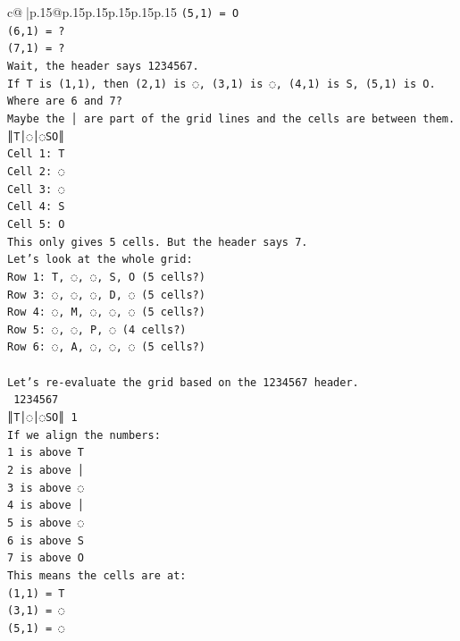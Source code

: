 \documentclass{article}
\begin{document}
{\begin{supertabular}{c@{$\;$}|p{.15\linewidth}@{}p{.15\linewidth}p{.15\linewidth}p{.15\linewidth}p{.15\linewidth}p{.15\linewidth}}
{{{\texttt{(5,1) = O} \\
\texttt{(6,1) = ?} \\
\texttt{(7,1) = ?} \\
\texttt{Wait, the header says 1234567.} \\
\texttt{If T is (1,1), then (2,1) is ◌, (3,1) is ◌, (4,1) is S, (5,1) is O.} \\
\texttt{Where are 6 and 7?} \\
\texttt{Maybe the │ are part of the grid lines and the cells are between them.} \\
\texttt{║T│◌│◌SO║} \\
\texttt{Cell 1: T} \\
\texttt{Cell 2: ◌} \\
\texttt{Cell 3: ◌} \\
\texttt{Cell 4: S} \\
\texttt{Cell 5: O} \\
\texttt{This only gives 5 cells. But the header says 7.} \\
\texttt{Let's look at the whole grid:} \\
\texttt{Row 1: T, ◌, ◌, S, O (5 cells?)} \\
\texttt{Row 3: ◌, ◌, ◌, D, ◌ (5 cells?)} \\
\texttt{Row 4: ◌, M, ◌, ◌, ◌ (5 cells?)} \\
\texttt{Row 5: ◌, ◌, P, ◌ (4 cells?)} \\
\texttt{Row 6: ◌, A, ◌, ◌, ◌ (5 cells?)} \\
\\ 
\texttt{Let's re{-}evaluate the grid based on the 1234567 header.} \\
\texttt{ 1234567} \\
\texttt{║T│◌│◌SO║ 1} \\
\texttt{If we align the numbers:} \\
\texttt{1 is above T} \\
\texttt{2 is above │} \\
\texttt{3 is above ◌} \\
\texttt{4 is above │} \\
\texttt{5 is above ◌} \\
\texttt{6 is above S} \\
\texttt{7 is above O} \\
\texttt{This means the cells are at:} \\
\texttt{(1,1) = T} \\
\texttt{(3,1) = ◌} \\
\texttt{(5,1) = ◌} \\
}}}
\end{supertabular}}
\end{document}
